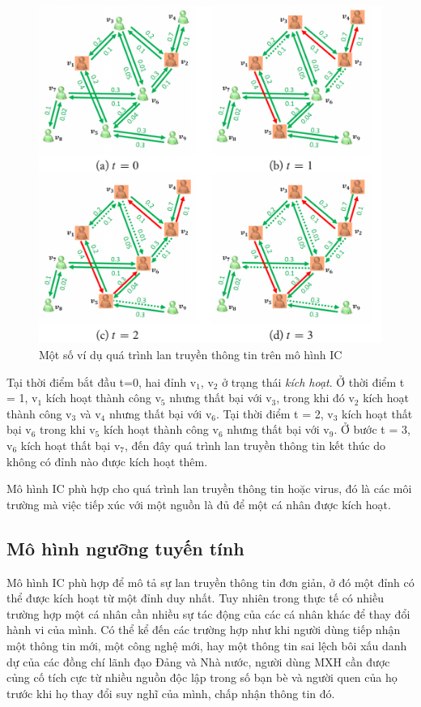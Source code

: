 		\begin{center}
			\begin{figure}[H]
				\begin{center}
					\includegraphics [scale=1]{picture/Hinh2_1}
				\end{center}
				\caption{Một số ví dụ quá trình lan truyền thông tin trên mô hình IC}
				\label{refhinh2_1}
			\end{figure}
		\end{center}
	Tại thời điểm bắt đầu t=0, hai đỉnh v$_{1}$, v$_{2}$ ở trạng thái {\itshape kích hoạt}. Ở thời điểm t = 1, v$_{1}$ kích hoạt thành công v$_{5}$ nhưng thất bại với v$_{3}$, trong khi đó v$_{2}$ kích hoạt thành công v$_{3}$ và v$_{4}$ nhưng thất bại với v$_{6}$. Tại thời điểm t = 2, v$_{3}$ kích hoạt thất bại v$_{6}$ trong khi v$_{5}$ kích hoạt thành công v$_{6}$ nhưng thất bại với v$_{9}$. Ở bước t = 3, v$_{6}$ kích hoạt thất bại v$_{7}$, đến đây quá trình lan truyền thông tin kết thúc do không có đỉnh nào được kích hoạt thêm.
	
	Mô hình IC phù hợp cho quá trình lan truyền thông tin hoặc virus, đó là các môi trường mà việc tiếp xúc với một nguồn là đủ để một cá nhân được kích hoạt.
	
	\subsection{Mô hình ngưỡng tuyến tính}
	Mô hình IC phù hợp để mô tả sự lan truyền thông tin đơn giản, ở đó một đỉnh có thể được kích hoạt từ một đỉnh duy nhất. Tuy nhiên trong thực tế có nhiều trường hợp một cá nhân cần nhiều sự tác động của các cá nhân khác để thay đổi hành vi của mình. Có thể kể đến các trường hợp như khi người dùng tiếp nhận một thông tin mới, một công nghệ mới, hay một thông tin sai lệch bôi xấu danh dự của các đồng chí lãnh đạo Đảng và Nhà nước, người dùng MXH cần được củng cố tích cực từ nhiều nguồn độc lập trong số bạn bè và người quen của họ trước khi họ thay đổi suy nghĩ của mình, chấp nhận thông tin đó.
	
